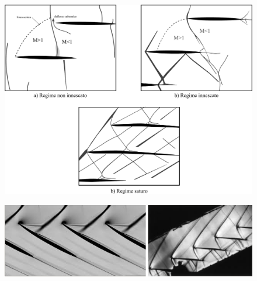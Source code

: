 \begin{figure}[h!]
\centering
  \includegraphics[width=.8\textwidth]{fig/Schlieren1.pdf}
\caption{}
\label{fig:Schlieren1}
\end{figure}
\begin{figure}[h!]
\centering
  \includegraphics[width=.8\textwidth]{fig/Schlieren2.png}
\caption{}
\label{fig:Schlieren2}
\end{figure}
